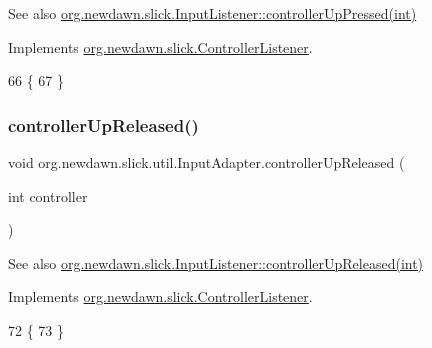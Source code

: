 \begin{DoxySeeAlso}{See also}
\mbox{\hyperlink{interfaceorg_1_1newdawn_1_1slick_1_1_controller_listener_a7cb917761de1e555b23469042b6f1e03}{org.\+newdawn.\+slick.\+Input\+Listener\+::controller\+Up\+Pressed(int)}} 
\end{DoxySeeAlso}


Implements \mbox{\hyperlink{interfaceorg_1_1newdawn_1_1slick_1_1_controller_listener_a7cb917761de1e555b23469042b6f1e03}{org.\+newdawn.\+slick.\+Controller\+Listener}}.


\begin{DoxyCode}
66                                                     \{
67     \}
\end{DoxyCode}
\mbox{\label{classorg_1_1newdawn_1_1slick_1_1util_1_1_input_adapter_a78fed236d44ced5cc4fc1b1c093f50fb}} 
\subsubsection{\texorpdfstring{controller\+Up\+Released()}{controllerUpReleased()}}
{\footnotesize\ttfamily void org.\+newdawn.\+slick.\+util.\+Input\+Adapter.\+controller\+Up\+Released (\begin{DoxyParamCaption}\item[{int}]{controller }\end{DoxyParamCaption})\hspace{0.3cm}{\ttfamily [inline]}}

\begin{DoxySeeAlso}{See also}
\mbox{\hyperlink{interfaceorg_1_1newdawn_1_1slick_1_1_controller_listener_a1342ad9ad1f7314b4eb10c20c21a9d50}{org.\+newdawn.\+slick.\+Input\+Listener\+::controller\+Up\+Released(int)}} 
\end{DoxySeeAlso}


Implements \mbox{\hyperlink{interfaceorg_1_1newdawn_1_1slick_1_1_controller_listener_a1342ad9ad1f7314b4eb10c20c21a9d50}{org.\+newdawn.\+slick.\+Controller\+Listener}}.


\begin{DoxyCode}
72                                                      \{
73     \}
\end{DoxyCode}
\mbox{\label{classorg_1_1newdawn_1_1slick_1_1util_1_1_input_adapter_a7aeb6742cd50649e17774ccbe2ebc9ea}} 
